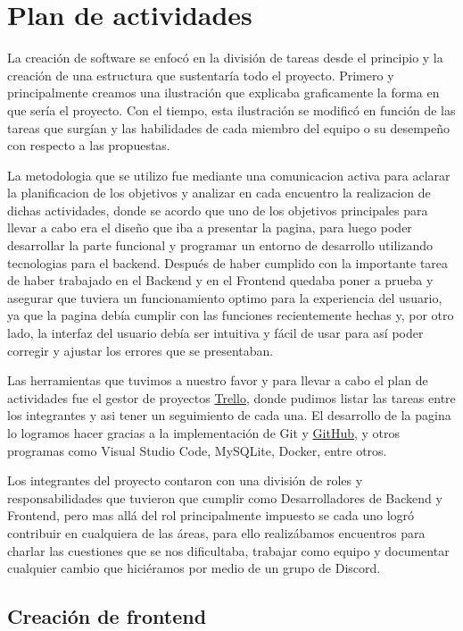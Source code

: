 \section{Plan de actividades}

La creación de software se enfocó en la división de tareas desde el principio y la creación de una estructura que sustentaría todo el proyecto. Primero y principalmente creamos una ilustración que explicaba graficamente la forma en que sería el proyecto. Con el tiempo, esta ilustración se modificó en función de las tareas que surgían y las habilidades de cada miembro del equipo o su desempeño con respecto a las propuestas. 

La metodologia que se utilizo fue mediante una comunicacion activa para aclarar la planificacion de los objetivos y analizar en cada encuentro la realizacion de dichas actividades, donde se acordo que uno de los objetivos principales para llevar a cabo era el diseño que iba a presentar la pagina, para luego poder desarrollar la parte funcional y programar un entorno de desarrollo utilizando tecnologias para el backend. Después de haber cumplido con la importante tarea de haber trabajado en el Backend y en el Frontend quedaba poner a prueba y asegurar que tuviera un funcionamiento optimo para la experiencia del usuario, ya que la pagina debía cumplir con las funciones recientemente hechas y, por otro lado, la interfaz del usuario debía ser intuitiva y fácil de usar para así poder corregir y ajustar los errores que se presentaban.

Las herramientas que tuvimos a nuestro favor y para llevar a cabo el plan de actividades fue el gestor de proyectos \href{https://trello.com/b/gpuunRxX/tp-ids}{Trello}, donde pudimos listar las tareas entre los integrantes y asi tener un seguimiento de cada una. El desarrollo de la pagina lo logramos hacer gracias a la implementación de Git y \href{https://github.com/MaxiFttInst/UBA_TP_IDS}{GitHub}, y otros programas como Visual Studio Code, MySQLite, Docker, entre otros.

Los integrantes del proyecto contaron con una división de roles y responsabilidades que tuvieron que cumplir como Desarrolladores de Backend y Frontend, pero mas allá del rol principalmente impuesto se cada uno logró contribuir en cualquiera de las áreas, para ello realizábamos encuentros para charlar las cuestiones que se nos dificultaba, trabajar como equipo y documentar cualquier cambio que hiciéramos por medio de un grupo de Discord.

\subsection{Creación de frontend}

